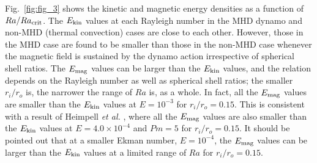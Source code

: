 {\color{red} %
Fig.~\ref{fig:fig_3} shows the kinetic and magnetic energy densities as a function of $Ra / Ra_{\rm crit}$.
}
{\color{red} %
The $E_{\rm kin}$ values at each Rayleigh number in the MHD dynamo and non-MHD (thermal convection) cases are close to each other.
However, those in the MHD case are found to be smaller than those in the non-MHD case whenever the magnetic field is sustained by the dynamo action irrespective of spherical shell ratios.
The $E_{\rm mag}$ values can be larger than the $E_{\rm kin}$ values, and the relation depends on the Rayleigh number as well as spherical shell ratios; the smaller $r_i / r_o$ is, the narrower the range of $Ra$ is, as a whole.
In fact, all the $E_{\rm mag}$ values are smaller than the $E_{\rm kin}$ values at $E = 10^{-3}$ for $r_i / r_o = 0.15$.
This is consistent with a result of Heimpell {\it et al.} , where all the $E_{\rm mag}$ values are also smaller than the $E_{\rm kin}$ values at $E = 4.0 \times 10^{-4}$ and $Pm = 5$ for $r_i / r_o = 0.15$.
It should be pointed out that at a smaller Ekman number, $E = 10^{-4}$, the $E_{\rm mag}$ values can be larger than the $E_{\rm kin}$ values at a limited range of $Ra$ for $r_i / r_o = 0.15$.
}

